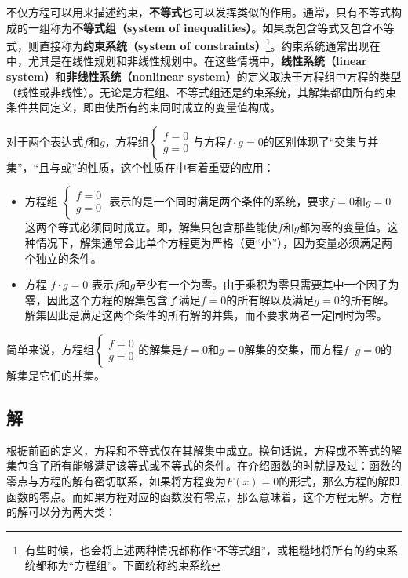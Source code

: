 不仅方程可以用来描述约束，\textbf{不等式}也可以发挥类似的作用。通常，只有不等式构成的一组称为\textbf{不等式组（system of inequalities）}。如果既包含等式又包含不等式，则直接称为\textbf{约束系统（system of constraints）}\footnote{有些时候，也会将上述两种情况都称作“不等式组”，或粗糙地将所有的约束系统都称为“方程组”。下面统称约束系统}。约束系统通常出现在中，尤其是在线性规划和非线性规划中。在这些情境中，\textbf{线性系统（linear system）}和\textbf{非线性系统（nonlinear system）}的定义取决于方程组中方程的类型（线性或非线性）。无论是方程组、不等式组还是约束系统，其解集都由所有约束条件共同定义，即由使所有约束同时成立的变量值构成。

对于两个表达式$f$和$g$，方程组$\begin{cases}f = 0 \\ g = 0\end{cases}$与方程$f \cdot g = 0$的区别体现了“交集与并集”，“且与或”的性质，这个性质在中有着重要的应用：

\begin{itemize}
\item 方程组 $\begin{cases}f = 0 \\ g = 0\end{cases}$ 表示的是一个同时满足两个条件的系统，要求$f = 0$和$g = 0$这两个等式必须同时成立。即，解集只包含那些能使$f$和$g$都为零的变量值。这种情况下，解集通常会比单个方程更为严格（更“小”），因为变量必须满足两个独立的条件。
\item 方程 $f \cdot g = 0$ 表示$f$和$g$至少有一个为零。由于乘积为零只需要其中一个因子为零，因此这个方程的解集包含了满足$f = 0$的所有解以及满足$g = 0$的所有解。解集因此是满足这两个条件的所有解的并集，而不要求两者一定同时为零。
\end{itemize}

简单来说，方程组$\begin{cases}f = 0 \\ g = 0\end{cases}$的解集是$f = 0$和$g = 0$解集的交集，而方程$f \cdot g = 0$的解集是它们的并集。

\subsection{解}

根据前面的定义，方程和不等式仅在其解集中成立。换句话说，方程或不等式的解集包含了所有能够满足该等式或不等式的条件。在介绍函数的时就提及过：函数的零点与方程的解有密切联系，如果将方程变为$F(x)=0$的形式，那么方程的解即函数的零点。而如果方程对应的函数没有零点，那么意味着，这个方程无解。方程的解可以分为两大类：

